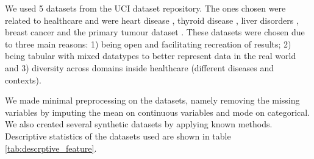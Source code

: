 

We used 5 datasets from the UCI dataset repository. The ones chosen were related to healthcare and were heart disease \cite{misc_heart_disease_45}, thyroid disease \cite{misc_thyroid_disease_102}, liver disorders \cite{misc_liver_disorders_60}, breast cancer \cite{misc_breast_cancer_wisconsin_diagnostic_17} and the primary tumour dataset \cite{misc_primary_tumor_83}. These datasets were chosen due to three main reasons: 1) being open and facilitating recreation of results; 2) being tabular with mixed datatypes to better represent data in the real world and 3) diversity across domains inside healthcare (different diseases and contexts).

We made minimal preprocessing on the datasets, namely removing the missing variables by imputing the mean on continuous variables and mode on categorical.
We also created several synthetic datasets by applying known methods. Descriptive statistics of the datasets used are shown in table \ref{tab:descrptive_feature}.
